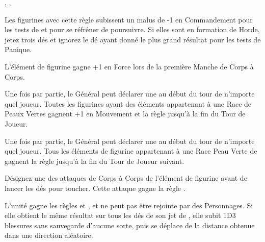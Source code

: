 \begin{multicols}{3}
\begin{center}
\strider{\forest}, \unruly{}, \insignificant{}
\end{center}

\end{multicols}

\vspace*{-10pt}\armyspecialruleentry{\unruly}

Les figurines avec cette règle subissent un malus de -1 en Commandement pour les tests de \frenzy{} et pour se réfréner de poursuivre. Si elles sont en formation de Horde, jetez trois dés et ignorez le dé ayant donné le plus grand résultat pour les tests de Panique.

\armyspecialruleentry{\borntofight}

L'élément de figurine gagne +1 en Force lors de la première Manche de Corps à Corps.


\begin{multicols}{2}\raggedcolumns
\setlength{\columnseprule}{1pt}
\renewcommand{\columnseprulecolor}{\color{black!30}}
\armyspecialruleentry{\waaargh}

Une fois par partie, le Général peut déclarer une \waaargh{} au début du tour de n'importe quel joueur. Toutes les figurines ayant des éléments appartenant à une Race de Peaux Vertes gagnent +1 en Mouvement et la règle \swiftstride{} jusqu'à la fin du Tour de Joueur.

\columnbreak
\armyspecialruleentry{\greentide}

Une fois par partie, le Général peut déclarer une \greentide{} au début du tour de n'importe quel joueur. Tous les éléments de figurine appartenant à une Race Peau Verte de \goblins{} gagnent la règle \fightinextrarank{} jusqu'à la fin du Tour de Joueur suivant.

\end{multicols}

\armyspecialruleentry{\venomousfangs}

Désignez une des attaques de Corps à Corps de l'élément de figurine avant de lancer les dés pour toucher. Cette attaque gagne la règle \multiplewounds{\ordnance}{}.


L'unité gagne les règles  et \immunetopsychology{}, et ne peut pas être rejointe par des Personnages. Si elle obtient le même résultat sur tous les dés de son jet de \randommovement{}, elle subit 1D3 blessures sans sauvegarde d'aucune sorte, puis se déplace de la distance obtenue dans une direction aléatoire.

